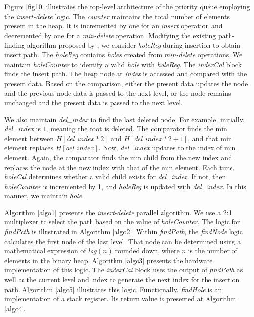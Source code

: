 \documentclass[10pt, conference, compsocconf]{IEEEtran}
\begin{document}
Figure \ref{fig10} illustrates the top-level architecture of the priority queue employing the {\it insert-delete} logic.
The {\it counter} maintains the total number of elements present in the heap.
It is incremented by one for an {\it insert} operation and decremented by one for a {\it min-delete} operation.
Modifying the existing path-finding algorithm proposed by \cite{pq6}, we consider {\it holeReg} during insertion to obtain insert path.
The {\it holeReg} contains {\it holes} created from {\it min-delete} operations.
We maintain {\it holeCounter} to identify a valid {\it hole} with {\it holeReg}.
The {\it indexCal} block finds the insert path.
The heap node at {\it index} is accessed and compared with the present data.
Based on the comparison, either the present data updates the node and the previous node data is passed to the next level, or the node remains unchanged and the present data is passed to the next level.

We also maintain {\it del\_index} to find the last deleted node.
For example, initially, {\it del\_index} is $1$, meaning the root is deleted.
The comparator finds the min element between $H[del\_index*2]$ and $H[del\_index*2 + 1]$, and that min element replaces $H[del\_index]$.
Now, {\it del\_index} updates to the index of min element.
Again, the comparator finds the min child from the new index and replaces the node at the new index with that of the min element.
Each time, {\it holeCal} determines whether a valid child exists for {\it del\_index}.
If not, then {\it holeCounter} is incremented by 1, and {\it holeReg} is updated with {\it del\_index}.
In this manner, we maintain {\it hole}.

Algorithm \ref{algo1} presents the {\it insert-delete} parallel algorithm.
We use a 2:1 multiplexer to select the path based on the value of {\it holeCounter}.
The logic for {\it findPath} is illustrated in Algorithm \ref{algo2}.
Within {\it findPath}, the {\it findNode} logic calculates the first node of the last level.
That node can be determined using a mathematical expression of $log(n)$ rounded down, where $n$ is the number of elements in the binary heap.
Algorithm \ref{algo3} presents the hardware implementation of this logic.
The {\it indexCal} block uses the output of {\it findPath} as well as the current level and index to generate the next index for the insertion path. Algorithm \ref{algo5} illustrates this logic.
Functionally, {\it findHole} is an implementation of a stack register. Its return value is presented at Algorithm \ref{algo4}.
\end{document}
